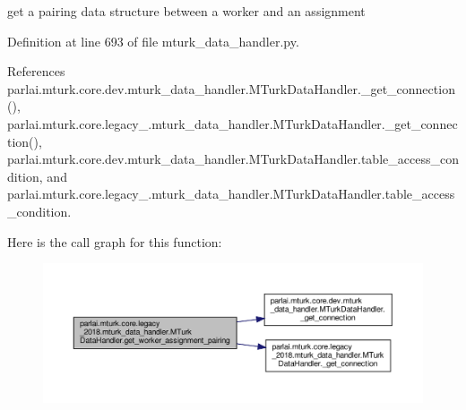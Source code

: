 \begin{DoxyVerb}get a pairing data structure between a worker and an assignment\end{DoxyVerb}
 

Definition at line 693 of file mturk\+\_\+data\+\_\+handler.\+py.



References parlai.\+mturk.\+core.\+dev.\+mturk\+\_\+data\+\_\+handler.\+M\+Turk\+Data\+Handler.\+\_\+get\+\_\+connection(), parlai.\+mturk.\+core.\+legacy\+\_.\+mturk\+\_\+data\+\_\+handler.\+M\+Turk\+Data\+Handler.\+\_\+get\+\_\+connection(), parlai.\+mturk.\+core.\+dev.\+mturk\+\_\+data\+\_\+handler.\+M\+Turk\+Data\+Handler.\+table\+\_\+access\+\_\+condition, and parlai.\+mturk.\+core.\+legacy\+\_.\+mturk\+\_\+data\+\_\+handler.\+M\+Turk\+Data\+Handler.\+table\+\_\+access\+\_\+condition.

Here is the call graph for this function\+:
\nopagebreak
\begin{figure}[H]
\begin{center}
\leavevmode
\includegraphics[width=350pt]{classparlai_1_1mturk_1_1core_1_1legacy__2018_1_1mturk__data__handler_1_1MTurkDataHandler_a8478ff4b3117b30f5528ae7bb6533e51_cgraph}
\end{center}
\end{figure}
\mbox{\label{classparlai_1_1mturk_1_1core_1_1legacy__2018_1_1mturk__data__handler_1_1MTurkDataHandler_aaaee48085add1dcdca33b9e3c41c3444}} 
